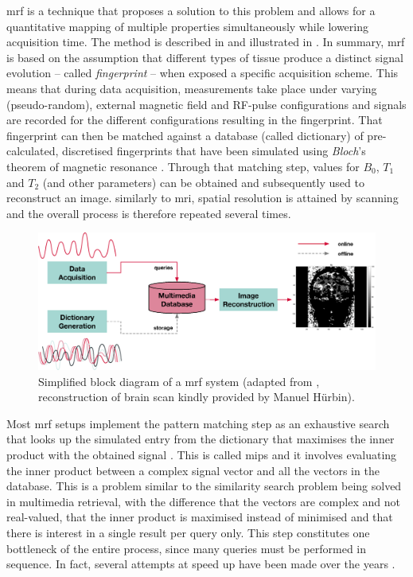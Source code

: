 \acrfull{mrf} is a technique \cite{Ma:2013Magnetic} that proposes a solution to this problem and allows for a quantitative mapping of multiple properties simultaneously while lowering acquisition time. The method is described in \cite{Bipin:2019Magnetic} and illustrated in . In summary, \acrshort{mrf} is based on the assumption that different types of tissue produce a distinct signal evolution -- called \emph{fingerprint} -- when exposed a specific acquisition scheme. This means that during data acquisition, measurements take place under varying (pseudo-random), external magnetic field and RF-pulse configurations and signals are recorded for the different configurations resulting in the fingerprint. That fingerprint can then be matched against a database (called dictionary) of pre-calculated, discretised fingerprints that have been simulated using \emph{Bloch}'s theorem of magnetic resonance \cite{Bloch:1946Nuclear}. Through that matching step, values for $B_0$, $T_1$ and $T_2$ (and other parameters) can be obtained and subsequently used to reconstruct an image. similarly to \acrshort{mri}, spatial resolution is attained by scanning and the overall process is therefore repeated several times.

\begin{figure}[tb]
    \centering
    \includegraphics[width=\textwidth]{figures/mrf.eps}
    \caption{Simplified block diagram of a \acrshort{mrf} system (adapted from \cite{Bipin:2019Magnetic}, reconstruction of brain scan kindly provided by Manuel Hürbin).}
    \label{figure:mrf}
\end{figure}

Most \acrshort{mrf} setups implement the pattern matching step as an exhaustive search that looks up the simulated entry from the dictionary that maximises the inner product with the obtained signal \cite{Bipin:2019Magnetic}. This is called \acrfull{mips} and it involves evaluating the inner product between a complex signal vector and all the vectors in the database. This is a problem similar to the similarity search problem being solved in multimedia retrieval, with the difference that the vectors are complex and not real-valued, that the inner product is maximised instead of minimised and that there is interest in a single result per query only. This step constitutes one bottleneck of the entire process, since many queries must be performed in sequence. In fact, several attempts at speed up have been made over the years \cite{Mcgivney:2014SVD}.

